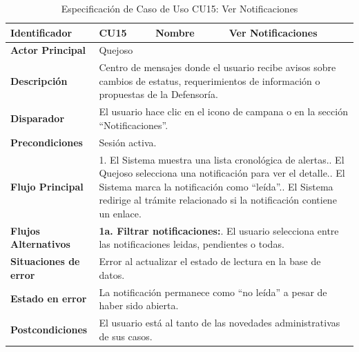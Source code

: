 \vspace{0.8cm}

\begingroup
\setlength{\parskip}{0pt}
\begin{longtable}{|p{3.5cm}|p{2cm}|p{2.5cm}|p{7cm}|}
\caption{Especificación de Caso de Uso CU15: Ver Notificaciones}
\label{tab:cu15_ver_notificaciones} \\
\hline
\textbf{Identificador} & CU15 & \textbf{Nombre} & Ver Notificaciones \\ \hline
\textbf{Actor Principal} & \multicolumn{3}{p{11.5cm}|}{Quejoso} \\ \hline
\textbf{Descripción} & \multicolumn{3}{p{11.5cm}|}{Centro de mensajes donde el usuario recibe avisos sobre cambios de estatus, requerimientos de información o propuestas de la Defensoría.} \\ \hline
\textbf{Disparador} & \multicolumn{3}{p{11.5cm}|}{El usuario hace clic en el icono de campana o en la sección ``Notificaciones''.} \\ \hline
\textbf{Precondiciones} & \multicolumn{3}{p{11.5cm}|}{Sesión activa.} \\ \hline
\textbf{Flujo Principal} & \multicolumn{3}{p{11.5cm}|}{1. El Sistema muestra una lista cronológica de alertas.\newline 2. El Quejoso selecciona una notificación para ver el detalle.\newline 3. El Sistema marca la notificación como ``leída''.\newline 4. El Sistema redirige al trámite relacionado si la notificación contiene un enlace.} \\ \hline
\textbf{Flujos Alternativos} & \multicolumn{3}{p{11.5cm}|}{\textbf{1a. Filtrar notificaciones:}\newline 1. El usuario selecciona entre las notificaciones leidas, pendientes o todas.} \\ \hline
\textbf{Situaciones de error} & \multicolumn{3}{p{11.5cm}|}{Error al actualizar el estado de lectura en la base de datos.} \\ \hline
\textbf{Estado en error} & \multicolumn{3}{p{11.5cm}|}{La notificación permanece como ``no leída'' a pesar de haber sido abierta.} \\ \hline
\textbf{Postcondiciones} & \multicolumn{3}{p{11.5cm}|}{El usuario está al tanto de las novedades administrativas de sus casos.} \\ \hline
\end{longtable}
\endgroup


